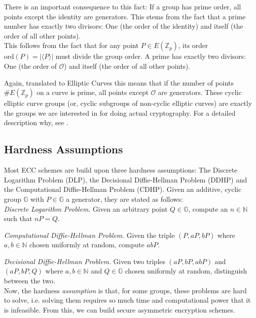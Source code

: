 There is an important consequence to this fact: If a group has prime order, all points except the identity are generators.
This stems from the fact that a prime number has exactly two divisors: One (the order of the identity) and itself (the order of all other points).
\\
This follows from the fact that for any point $P \in E(\mathbb{Z}_p)$, its order $\text{ord}(P) = | \langle P \rangle |$ must divide the group order.
A prime has exactly two divisors: One (the order of $\mathcal{O}$) and itself (the order of all other points).

Again, translated to Elliptic Curves this means that if the number of points $\#E(\mathbb{Z}_p)$ on a curve is prime, all points except $\mathcal{O}$ are generators.
These cyclic elliptic curve groups (or, cyclic subgroups of non-cyclic elliptic curves) are exactly the groups we are interested in for doing actual cryptography. For a detailed description why, see \cite[p.~321]{katz_introduction_2015}.

\subsection{Hardness Assumptions}

Most ECC schemes are build upon three hardness assumptions: The Discrete Logarithm Problem (DLP), the Decisional Diffie-Hellman Problem (DDHP) and the Computational Diffie-Hellman Problem (CDHP).
Given an additive, cyclic group $\mathbb{G}$ with $P \in \mathbb{G}$ a generator, they are stated as follows:
\\

\emph{Discrete Logarithm Problem.} Given an arbitrary point $Q \in \mathbb{G}$, compute an $n \in \mathbb{N}$ such that $n P = Q$. %

\emph{Computational Diffie-Hellman Problem.} Given the triple $(P, aP, bP)$ where $a, b \in \mathbb{N}$ chosen uniformly at random, compute $abP$.

\emph{Decisional Diffie-Hellman Problem.} Given two triples $(aP, bP, abP)$ and $(aP, bP, Q)$ where $a, b \in \mathbb{N}$ and $Q \in \mathbb{G}$ chosen uniformly at random, distinguish between the two.
\\

Now, the hardness \emph{assumption} is that, for some groups, these problems are hard to solve, i.e. solving them requires so much time and computational power that it is infeasible.
From this, we can build secure asymmetric encryption schemes.

